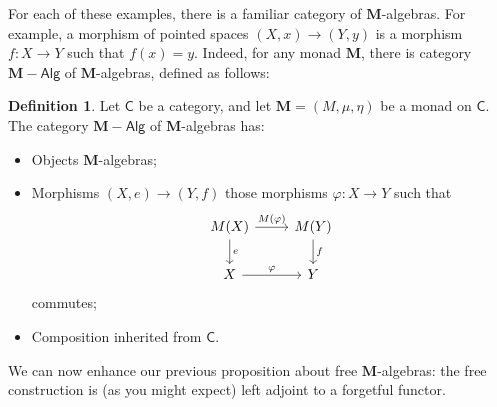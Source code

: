 \documentclass{article}
\theoremstyle{definition}
\newtheorem{defn}{Definition}
\newcommand{\C}{\mathsf{C}}
\newcommand{\M}{\mathbf{M}}
\newcommand{\Alg}{\mathsf{Alg}}
\begin{document}
For each of these examples, there is a familiar category of $\M$-algebras. For example, a morphism of pointed spaces $(X,x) \to (Y,y)$ is a morphism $f : X \to Y$ such that $f(x) = y$. Indeed, for any monad $\M$, there is category $\M{-}\Alg$ of $\M$-algebras, defined as follows:

\begin{defn}
    Let $\C$ be a category, and let $\M = (M,\mu,\eta)$ be a monad on $\C$. The category $\M{-}\Alg$ of $\M$-algebras has:
    \begin{itemize}
        \item Objects $\M$-algebras;
        \item Morphisms $(X,e) \to (Y,f)$ those morphisms $\varphi : X \to Y$ such that
        \[\begin{tikzcd}
        M(X) \rar["M(\varphi)"] \dar["e"] & M(Y) \dar["f"] \\
        X \rar["\varphi"] & Y
        \end{tikzcd}\]
        commutes;
        \item Composition inherited from $\C$.
    \end{itemize}
\end{defn}

We can now enhance our previous proposition about free $\M$-algebras: the free construction is (as you might expect) left adjoint to a forgetful functor.
\end{document}
